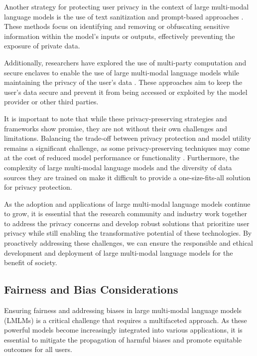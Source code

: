 \documentclass[11pt]{article}
\begin{document}
Another strategy for protecting user privacy in the context of large multi-modal language models is the use of text sanitization and prompt-based approaches \cite{ref245,ref246}. These methods focus on identifying and removing or obfuscating sensitive information within the model's inputs or outputs, effectively preventing the exposure of private data.

Additionally, researchers have explored the use of multi-party computation and secure enclaves to enable the use of large multi-modal language models while maintaining the privacy of the user's data \cite{ref247,ref105}. These approaches aim to keep the user's data secure and prevent it from being accessed or exploited by the model provider or other third parties.

It is important to note that while these privacy-preserving strategies and frameworks show promise, they are not without their own challenges and limitations. Balancing the trade-off between privacy protection and model utility remains a significant challenge, as some privacy-preserving techniques may come at the cost of reduced model performance or functionality \cite{ref248,ref249}. Furthermore, the complexity of large multi-modal language models and the diversity of data sources they are trained on make it difficult to provide a one-size-fits-all solution for privacy protection.

As the adoption and applications of large multi-modal language models continue to grow, it is essential that the research community and industry work together to address the privacy concerns and develop robust solutions that prioritize user privacy while still enabling the transformative potential of these technologies. By proactively addressing these challenges, we can ensure the responsible and ethical development and deployment of large multi-modal language models for the benefit of society.

\subsection{Fairness and Bias Considerations}

Ensuring fairness and addressing biases in large multi-modal language models (LMLMs) is a critical challenge that requires a multifaceted approach. As these powerful models become increasingly integrated into various applications, it is essential to mitigate the propagation of harmful biases and promote equitable outcomes for all users.
\end{document}
